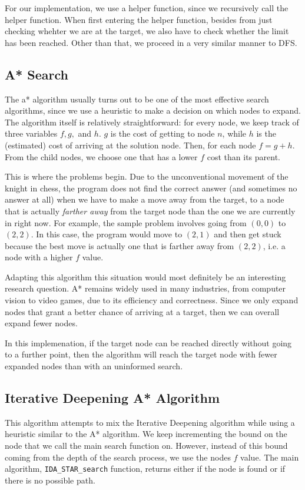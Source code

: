 \documentclass{article}
\begin{document}
	For our implementation, we use a helper function, since we recursively call the helper function. When first
	entering the helper function, besides from just checking whehter we are at the target, we also have to check
	whether the limit has been reached. Other than that, we proceed in a very similar manner to DFS.

\subsection{A* Search}
	The a* algorithm usually turns out to be one of the most effective search algorithms, since we 
	use a heuristic to make a decision on which nodes to expand. The algorithm itself is relatively 
	straightforward: for every node, we keep track of three variables $f, g,$ and $h$.  $g$ is the 
	cost of getting to node $n$, while $h$ is the (estimated) cost of arriving at the solution node. 
	Then, for each node $f = g + h$. From the child nodes, we choose one that has a lower $f$ cost than
	its parent. 

	This is where the problems begin. Due to the unconventional movement of the knight in chess, 
	the program does not find the correct answer (and sometimes no answer at all) when we have to make
	a move away from the target, to a node that is actually \textit{farther away} from the target node
	than the one we are currently in right now. For example, the sample problem involves going from 
	$(0, 0)$ to $(2, 2)$. In this case, the program would move to $(2, 1)$ and then get stuck because
	the best move is actually one that is farther away from $(2, 2)$, i.e. a node with a higher $f$ value.

	Adapting this algorithm this situation would most definitely be an interesting research question. 
	A* remains widely used in many industries, from computer vision to video games, due to its efficiency
	and correctness. Since we only expand nodes that grant a better chance of arriving at a target, then
	we can overall expand fewer nodes.

	In this implemenation, if the target node can be reached directly without going to a further point, 
	then the algorithm will reach the target node with fewer expanded nodes than with an uninformed 
	search. 
\subsection{Iterative Deepening A* Algorithm}
	This algorithm attempts to mix the Iterative Deepening algorithm while using a heuristic similar
	to the A* algorithm. We keep incrementing the bound on the node that we call the main search
	function on. However, instead of this bound coming from the depth of the search process, we
	use the nodes $f$ value. The main algorithm, \texttt{IDA\_STAR\_search} function, returns either
	if the node is found or if there is no possible path. 
\end{document}
